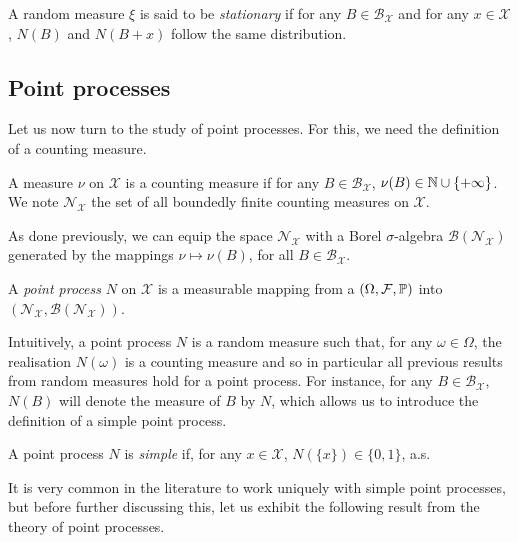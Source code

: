 \begin{definition}
    A random measure $\xi$ is said to be \emph{stationary} if 
    for any $B\in\mathcal{B}_{\mathcal{X}}$ and for any $x\in\mathcal{X}$, $N(B)$ and $N(B+x)$ follow the same distribution.
\end{definition}

\subsection{Point processes}

Let us now turn to the study of point processes. For this, we need the definition of a counting measure.

\begin{definition}
    A measure $\nu$ on $\mathcal{X}$ is a counting measure if for any $B\in\mathcal{B}_{\mathcal{X}}$, $\nu(B)\in{\mathbb N} \cup \{+\infty\}$.
    We note $\mathcal{N}_{\mathcal{X}}$ the set of all boundedly finite counting measures on $\mathcal{X}$.
\end{definition}

As done previously, we can equip the space $\mathcal{N}_{\mathcal{X}}$ with a Borel $\sigma$-algebra $\mathcal{B}(\mathcal{N}_{\mathcal{X}})$ generated by the mappings $\nu \mapsto \nu(B)$, for all $B\in\mathcal{B}_{\mathcal{X}}$.

\begin{definition}
    A \emph{point process} $N$ on $\mathcal{X}$ is a measurable mapping from a $(\Omega, \mathcal{F}, {\mathbb P})$ into $(\mathcal{N}_{\mathcal{X}}, \mathcal{B}(\mathcal{N}_{\mathcal{X}}))$.
\end{definition}

Intuitively, a point process $N$ is a random measure \parencite[Corollary 1.6.4.]{Baccelli2020} such that, for any $\omega\in\Omega$, the realisation $N(\omega)$ is a counting measure and so in particular all previous results from random measures hold for a point process.
For instance, for any $B\in\mathcal{B}_{\mathcal{X}}$, $N(B)$ will denote the measure of $B$ by $N$, which allows us to introduce the definition of a simple point process.

\begin{definition}
A point process $N$ is \emph{simple} if, for any $x\in\mathcal{X}$, $N(\{x\}) \in \{0, 1\}$, a.s.
\end{definition}

It is very common in the literature to work uniquely with simple point processes, but before further discussing this, let us exhibit the following result from the theory of point processes.

